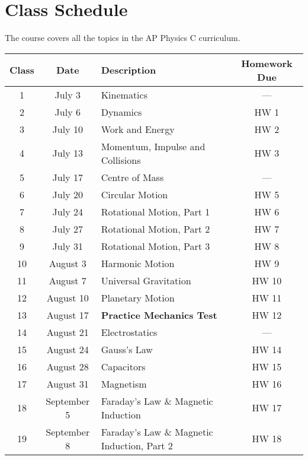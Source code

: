 \documentclass{../../oss-handout}
\begin{document}
\section{Class Schedule}
The course covers all the topics in the AP Physics C curriculum.\\
\bgroup
\def\arraystretch{1.1}
\begin{center}
  \vspace{-.5in}
  \begin{tabular}{|c|c|p{4in}|c|}
    \hline
    \rowcolor{lightgray}
    \textbf{Class} & \textbf{Date} & \textbf{Description} &
    \textbf{Homework Due} \\
    \hline\hline
    1 & July 3 & Kinematics & --- \\
    \hline
    2 & July 6 & Dynamics   & HW 1\\
    \hline
    3 & July 10 & Work and Energy & HW 2 \\
    \hline
    4 & July 13 & Momentum, Impulse and Collisions & HW 3 \\
    \hline
    5 & July 17 & Centre of Mass & --- \\
    \hline
    6 & July 20 & Circular Motion & HW 5 \\
    \hline
    7 & July 24 & Rotational Motion, Part 1 & HW 6 \\
    \hline
    8 & July 27 & Rotational Motion, Part 2 & HW 7 \\
    \hline
    9 & July 31 & Rotational Motion, Part 3 & HW 8 \\
    \hline
    10 & August 3 & Harmonic Motion & HW 9 \\
    \hline
    11 & August 7 & Universal Gravitation & HW 10 \\
    \hline
    12 & August 10 & Planetary Motion & HW 11 \\
    \hline
    \rowcolor{lightgray!50}
    13 & August 17 & \textbf{Practice Mechanics Test} & HW 12 \\
    \hline
    14 & August 21 & Electrostatics & --- \\
    \hline
    15 & August 24 & Gauss's Law & HW 14 \\
    \hline
    16 & August 28 & Capacitors & HW 15 \\
    \hline
    17 & August 31 & Magnetism  & HW 16\\
    \hline
    \rowcolor{yellow!50}
    18 & September 5 & Faraday's Law \& Magnetic Induction & HW 17 \\
    \hline
    \rowcolor{pink!50}
    19 & September 8 & Faraday's Law \& Magnetic Induction, Part 2 & HW 18 \\

\end{tabular}
\end{center}
\end{document}
